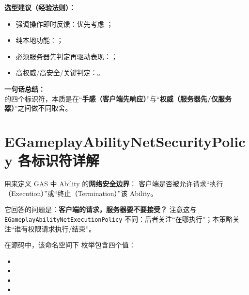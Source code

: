 \documentclass[10pt,CJKmath]{ctexart}
\begin{document}
\textbf{选型建议（经验法则）：}
\begin{itemize}
	\item 强调操作即时反馈：优先考虑 ；
	\item 纯本地功能：；
	\item 必须服务器先判定再驱动表现：；
	\item 高权威/高安全/关键判定：。
\end{itemize}

\textbf{一句话总结：}\\
 的四个标识符，本质是在“\textbf{手感（客户端先响应）}”与“\textbf{权威（服务器先/仅服务器）}”之间做不同取舍。

\section{EGameplayAbilityNetSecurityPolicy 各标识符详解}

 用来定义 GAS 中 Ability 的\textbf{网络安全边界}：  
客户端是否被允许请求“执行（Execution）”或“终止（Termination）”该 Ability。  

它回答的问题是：\textbf{客户端的请求，服务器要不要接受？}  
注意这与 \texttt{EGameplayAbilityNetExecutionPolicy} 不同：后者关注“在哪执行”；本策略关注“谁有权限请求执行/结束”。

在源码中，该命名空间下  枚举包含四个值：
\begin{itemize}
	\item {}
	\item {}
	\item {}
	\item {}
\end{itemize}
\end{document}
